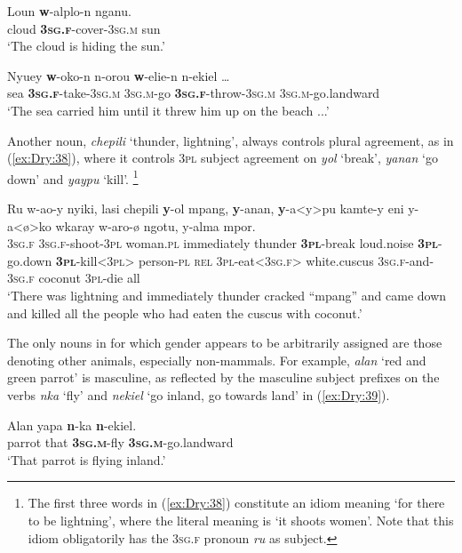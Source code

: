 \documentclass[output=collectionpaper]{langsci/langscibook}
\begin{document}
\ea \label{ex:Dry:36}
\gll Loun	\textbf{w}-alplo-n	nganu.\\
cloud \textbf{\textsc{3sg.f}}-cover-\textsc{3sg.m} sun\\
\glt `The cloud is hiding the sun.'
\z

\ea \label{ex:Dry:37}
\gll Nyuey	\textbf{w}-oko-n	n-orou	\textbf{w}-elie-n {n-ekiel \ldots} \\
sea \textbf{\textsc{3sg.f}}-take-\textsc{3sg.m} \textsc{3sg.m}-go \textbf{\textsc{3sg.f}}-throw-\textsc{3sg.m} \textsc{3sg.m}-go.landward \\
\glt `The sea carried him until it threw him up on the beach ...'
\z

Another noun, \textit{chepili} `thunder, lightning', always controls plural agreement, as in (\ref{ex:Dry:38}), where it controls \textsc{3pl} subject agreement on \textit{yol} `break', \textit{yanan} `go down' and \textit{yaypu} `kill'.%
\footnote{The first three words in (\ref{ex:Dry:38}) constitute an idiom meaning `for there to be lightning', where the literal meaning is `it shoots women'. Note that this idiom obligatorily has the \textsc{3sg.f} pronoun \textit{ru} as subject.}

\ea \label{ex:Dry:38}
\gll Ru	w-ao-y	nyiki,	lasi	chepili \textbf{y}-ol	mpang,	\textbf{y}-anan,	\textbf{y}-a<y>pu kamte-y	eni	y-a<ø>ko	wkaray w-aro-ø	ngotu,	y-alma	mpor.\\
\textsc{3sg.f} \textsc{3sg.f}-shoot-\textsc{3pl} woman.\textsc{pl} immediately  thunder \textbf{\textsc{3pl}}-break loud.noise \textbf{\textsc{3pl}}-go.down \textbf{\textsc{3pl}}-kill<\textsc{3pl}>  person-\textsc{pl} \textsc{rel} \textsc{3pl}-eat<\textsc{3sg.f}> white.cuscus
\textsc{3sg.f}-and-\textsc{3sg.f} coconut \textsc{3pl}-die all\\
\glt `There was lightning and immediately thunder cracked ``mpang'' and came down and killed all the people who had eaten the cuscus with coconut.'
\z

The only nouns in  for which gender appears to be arbitrarily assigned are those denoting other animals, especially non-mammals. For example, \textit{alan} `red and green parrot' is masculine, as reflected by the masculine subject prefixes on the verbs \textit{nka} `fly' and \textit{nekiel} `go inland, go towards land' in (\ref{ex:Dry:39}).

\ea \label{ex:Dry:39}
\gll Alan	yapa	\textbf{n}-ka	\textbf{n}-ekiel.\\
parrot that \textbf{\textsc{3sg.m}}-fly \textbf{\textsc{3sg.m}}-go.landward\\
\glt  `That parrot is flying inland.'
\z
\end{document}
